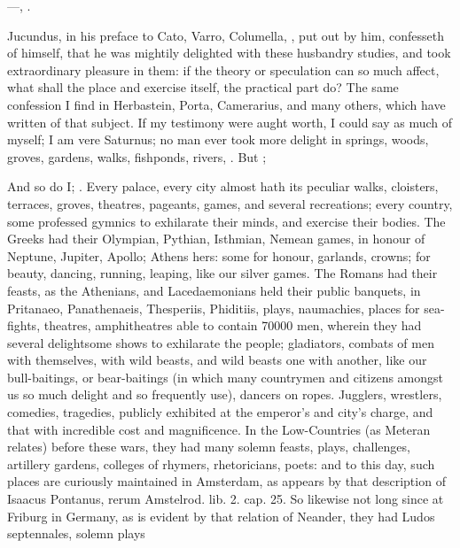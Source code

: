 {---, \etc{}.

Jucundus, in his preface to Cato, Varro, Columella, \etc{}, put out by
him, confesseth of himself, that he was mightily delighted with these
husbandry studies, and took extraordinary pleasure in them: if the
theory or speculation can so much affect, what shall the place and
exercise itself, the practical part do? The same confession I find in
Herbastein, Porta, Camerarius, and many others, which have written of
that subject. If my testimony were aught worth, I could say as much of
myself; I am vere Saturnus; no man ever took more delight in springs,
woods, groves, gardens, walks, fishponds, rivers, \etc{}. But
;

And so do I; .
Every palace, every city almost hath its peculiar walks, cloisters,
terraces, groves, theatres, pageants, games, and several recreations;
every country, some professed gymnics to exhilarate their minds, and
exercise their bodies. The Greeks had their Olympian, Pythian,
Isthmian, Nemean games, in honour of Neptune, Jupiter, Apollo; Athens
hers: some for honour, garlands, crowns; for beauty, dancing,
running, leaping, like our silver games. The Romans had their
feasts, as the Athenians, and Lacedaemonians held their public
banquets, in Pritanaeo, Panathenaeis, Thesperiis, Phiditiis, plays,
naumachies, places for sea-fights, theatres, amphitheatres able
to contain 70\thinspace{}000 men, wherein they had several delightsome shows to
exhilarate the people; gladiators, combats of men with
themselves, with wild beasts, and wild beasts one with another,  like
our bull-baitings, or bear-baitings (in which many countrymen and
citizens amongst us so much delight and so frequently use), dancers on
ropes. Jugglers, wrestlers, comedies, tragedies, publicly exhibited at
the emperor's and city's charge, and that with incredible cost and
magnificence. In the Low-Countries (as Meteran relates) before
these wars, they had many solemn feasts, plays, challenges, artillery
gardens, colleges of rhymers, rhetoricians, poets: and to this day,
such places are curiously maintained in Amsterdam, as appears by that
description of Isaacus Pontanus, rerum Amstelrod. lib. 2. cap. 25. So
likewise not long since at Friburg in Germany, as is evident by that
relation of Neander, they had Ludos septennales, solemn plays
}
